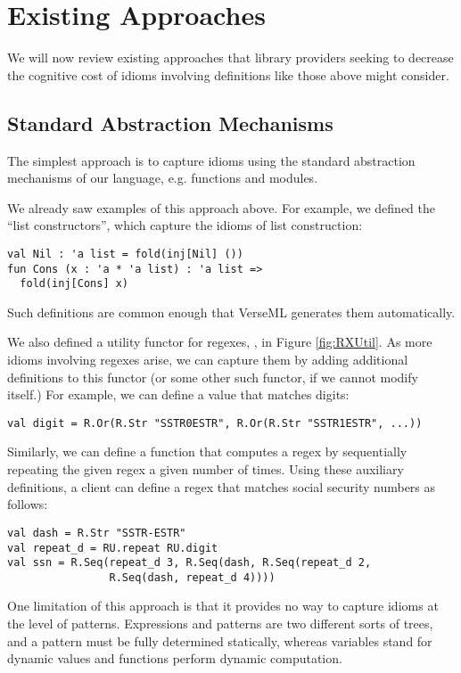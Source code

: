 \section{Existing Approaches}\label{sec:existing-approaches}
We will now review existing approaches that library providers seeking to decrease the cognitive cost of idioms involving definitions like those above might consider. 

\subsection{Standard Abstraction Mechanisms}
The simplest approach is to capture idioms using the standard abstraction mechanisms of our 
language, e.g. functions and modules. 

We already saw examples of this approach above. For example, we defined the ``list constructors'', which capture the idioms of list construction:
\begin{lstlisting}[numbers=none]
val Nil : 'a list = fold(inj[Nil] ())
fun Cons (x : 'a * 'a list) : 'a list => 
  fold(inj[Cons] x)
\end{lstlisting} 
Such definitions are common enough that VerseML generates them automatically.

We also defined a utility functor for regexes, , in Figure \ref{fig:RXUtil}. As more idioms involving regexes arise, we can capture them by adding additional definitions to this functor (or some other such functor, if we cannot modify  itself.) For example, we can define a value that matches digits:
\begin{lstlisting}[numbers=none]
val digit = R.Or(R.Str "SSTR0ESTR", R.Or(R.Str "SSTR1ESTR", ...))
\end{lstlisting}
Similarly, we can define a function  that computes a regex by sequentially repeating the given regex a given number of times. Using these auxiliary definitions, a client can define a regex that matches social security numbers as follows:
\begin{lstlisting}[numbers=none]
val dash = R.Str "SSTR-ESTR"
val repeat_d = RU.repeat RU.digit
val ssn = R.Seq(repeat_d 3, R.Seq(dash, R.Seq(repeat_d 2, 
                R.Seq(dash, repeat_d 4))))
\end{lstlisting}

One limitation of this approach is that it provides no way to capture idioms at the level of patterns. Expressions and patterns are two different sorts of trees, and a pattern must be fully determined statically, whereas variables stand for dynamic values and functions perform dynamic computation.

